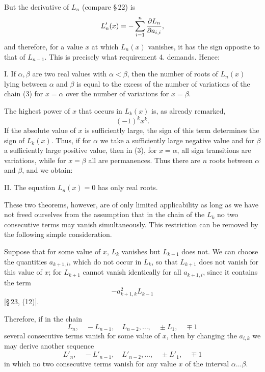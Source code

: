 \documentclass[11pt]{article}
\begin{document}
But the derivative of $L_n$ (compare \S\,22) is
\[
        L'_n(x)=-\sum_{i=1}^{n}{\partial L_n\over\partial a_{i,i}},
\]
and therefore, for a value $x$ at which $L_n(x)$ vanishes, it has the sign opposite to that of $L_{n-1}$. This is precisely what requirement 4. demands. Hence:

I. If $\alpha,\beta$ are two real values with $\alpha<\beta$, then the number of roots of $L_n(x)$ lying between $\alpha$ and $\beta$ is equal to the excess of the number of variations of the chain (3) for $x=\alpha$ over the number of variations for $x=\beta$.

The highest power of $x$ that occurs in $L_k(x)$ is, as already remarked,
\[
        (-1)^kx^k.
\]
If the absolute value of $x$ is sufficiently large, the sign of this term determines the sign of $L_k(x)$. Thus, if for $\alpha$ we take a sufficiently large negative value and for $\beta$ a sufficiently large positive value, then in (3), for $x=\alpha$, all sign transitions are variations, while for $x=\beta$ all are permanences. Thus there are $n$ roots between $\alpha$ and $\beta$, and we obtain:

II. The equation $L_n(x)=0$ has only real roots.

These two theorems, however, are of only limited applicability as long as we have not freed ourselves from the assumption that in the chain of the $L_k$ no two consecutive terms may vanish simultaneously. This restriction can be removed by the following simple consideration.

Suppose that for some value of $x$, $L_k$ vanishes but $L_{k-1}$ does not. We can choose the quantities $a_{k+1,i}$, which do not occur in $L_k$, so that $L_{k+1}$ does not vanish for this value of $x$; for $L_{k+1}$ cannot vanish identically for all $a_{k+1,i}$, since it contains the term
\[
        -a_{k+1,k}^2L_{k-1}
\]
[\S\,23, (12)].

Therefore, if in the chain
\begin{equation}
        L_n,
        \quad -L_{n-1},
        \quad L_{n-2},
        \ldots,
        \quad \pm L_1,
        \quad \mp1
\tag{5}
\end{equation}
several consecutive terms vanish for some value of $x$, then by changing the $a_{i,k}$ we may derive another sequence
\begin{equation}
        L'_n,
        \quad -L'_{n-1},
        \quad L'_{n-2},
        \ldots,
        \quad \pm L'_1,
        \quad \mp1
\tag{6}
\end{equation}
in which no two consecutive terms vanish for any value $x$ of the interval $\alpha\ldots\beta$.
\end{document}
